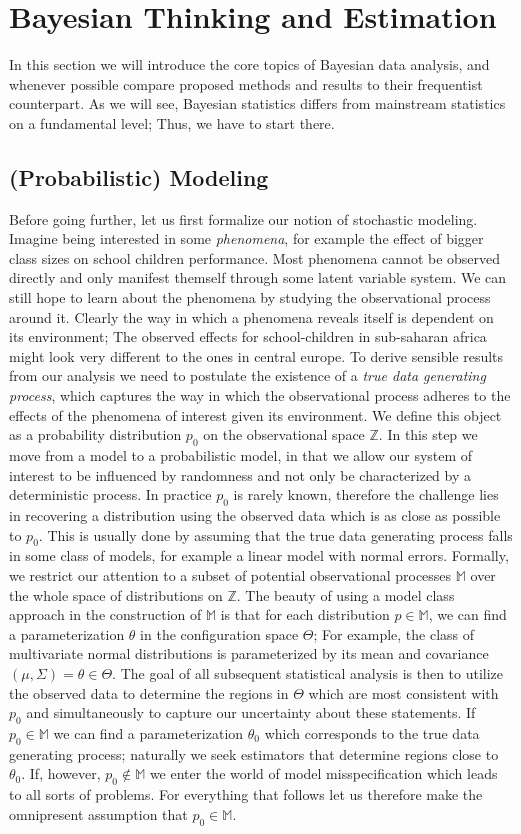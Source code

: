 \section{Bayesian Thinking and Estimation}
In this section we will introduce the core topics of Bayesian data analysis, and whenever possible compare proposed methods and results to their frequentist counterpart.
As we will see, Bayesian statistics differs from mainstream statistics on a fundamental level; Thus, we have to start there.

\subsection{(Probabilistic) Modeling}
Before going further, let us first formalize our notion of stochastic modeling.
Imagine being interested in some \textit{phenomena}, for example the effect of bigger class sizes on school children performance.
Most phenomena cannot be observed directly and only manifest themself through some latent variable system.
We can still hope to learn about the phenomena by studying the observational process around it.
Clearly the way in which a phenomena reveals itself is dependent on its environment;
The observed effects for school-children in sub-saharan africa might look very different to the ones in central europe.
To derive sensible results from our analysis we need to postulate the existence of a \textit{true data generating process}, which captures the way in which the observational process adheres to the effects of the phenomena of interest given its environment.
We define this object as a probability distribution $p_0$ on the observational space $\mathbb{Z}$.
In this step we move from a model to a probabilistic model, in that we allow our system of interest to be influenced by randomness and not only be characterized by a deterministic process.
In practice $p_0$ is rarely known, therefore the challenge lies in recovering a distribution using the observed data which is as close as possible to $p_0$.
This is usually done by assuming that the true data generating process falls in some class of models, for example a linear model with normal errors.
Formally, we restrict our attention to a subset of potential observational processes $\mathbb{M}$ over the whole space of distributions on $\mathbb{Z}$.
The beauty of using a model class approach in the construction of $\mathbb{M}$ is that for each distribution $p \in \mathbb{M}$, we can find a parameterization $\theta$ in the configuration space $\Theta$; For example, the class of multivariate normal distributions is parameterized by its mean and covariance $(\mu, \Sigma) = \theta \in \Theta$.
The goal of all subsequent statistical analysis is then to utilize the observed data to determine the regions in $\Theta$ which are most consistent with $p_0$ and simultaneously to capture our uncertainty about these statements.
If $p_0 \in \mathbb{M}$ we can find a parameterization $\theta_0$ which corresponds to the true data generating process; naturally we seek estimators that determine regions close to $\theta_0$. If, however, $p_0 \not\in \mathbb{M}$ we enter the world of model misspecification which leads to all sorts of problems.
For everything that follows let us therefore make the omnipresent assumption that $p_0 \in \mathbb{M}$.

